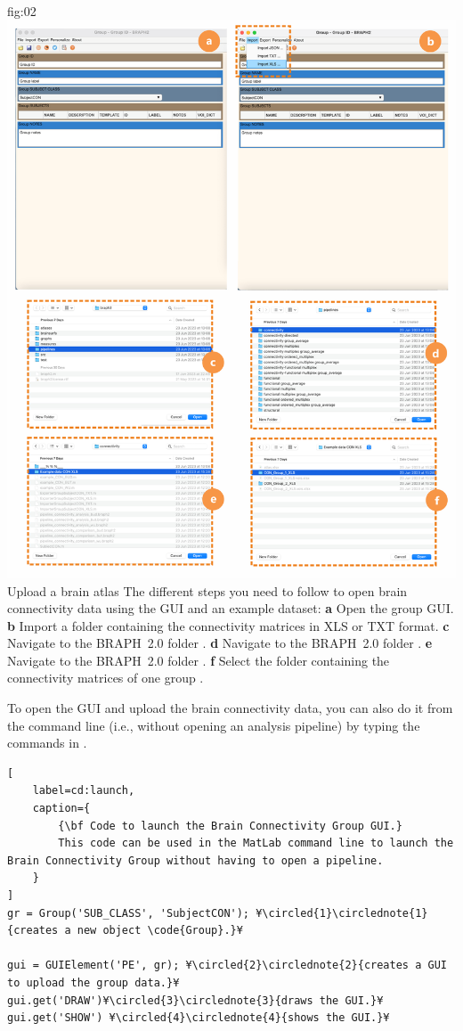 \documentclass[justified]{tufte-handout}
\begin{document}
	{fig:02}
	{
	\includegraphics{fig02.png}
	}
	{Upload a brain atlas}
	{
	The different steps you need to follow to open brain connectivity data using the GUI and an example dataset: 
	{\bf a} Open the group GUI.
	{\bf b} Import a folder containing the connectivity matrices in XLS or TXT format.
	{\bf c} Navigate to the BRAPH~2.0 folder .
	{\bf d} Navigate to the BRAPH~2.0 folder .
	{\bf e} Navigate to the BRAPH~2.0 folder .
	{\bf f} Select the folder containing the connectivity matrices of one group .
	}

To open the GUI and upload the brain connectivity data, you can also do it from the command line (i.e., without opening an analysis pipeline) by typing the commands in .
%
\begin{lstlisting}[
	label=cd:launch,
	caption={
		{\bf Code to launch the Brain Connectivity Group GUI.}
		This code can be used in the MatLab command line to launch the Brain Connectivity Group without having to open a pipeline.
	}
]
gr = Group('SUB_CLASS', 'SubjectCON'); ¥\circled{1}\circlednote{1}{creates a new object \code{Group}.}¥

gui = GUIElement('PE', gr); ¥\circled{2}\circlednote{2}{creates a GUI to upload the group data.}¥
gui.get('DRAW')¥\circled{3}\circlednote{3}{draws the GUI.}¥
gui.get('SHOW') ¥\circled{4}\circlednote{4}{shows the GUI.}¥
\end{lstlisting}
\end{document}
